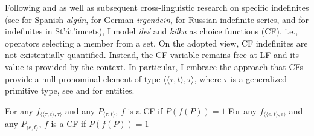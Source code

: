 \documentclass[output=paper,
]{langscibook}
\begin{document}
	\largerpage
	Following \cite{reinhart1997quantifier} and \citet{kratzer1998scope} as well as subsequent cross-linguistic research on specific indefinites (see \citealt{alonso-ovalle_menendez-benito2003some} for Spanish \textit{algún}, \citealt{kratzer_shimoyama2002indeterminate} for German \textit{irgendein}, \citealt{yanovich2005choice} for Russian indefinite series, and \citealt{matthewson1998interpretation} for indefinites in St’át’imcets), I model \textit{ileś} and \textit{kilka} as choice functions (CF), i.e., operators selecting a member from a set. On the adopted view, CF indefinites are not existentially quantified. Instead, the CF variable remains free at LF and its value is provided by the context. In particular, I embrace the approach that CFs provide a null pronominal element of type $\langle \langle \tau,t\rangle,\tau \rangle$, where $\tau$ is a generalized primitive type, see  and  for entities.





 \ea \ea For any $f_{\langle \langle \tau,t\rangle,\tau\rangle}$ and any $P_{\langle \tau,t\rangle}$, $f$ is a CF if $P(f(P))=1$\label{ex:cf-generalized}
 \ex For any $f_{\langle \langle e,t\rangle,e\rangle}$ and any $P_{\langle e,t\rangle}$, $f$ is a CF if $P(f(P))=1$\label{ex:cf-individuals}
 \z\z
\end{document}
